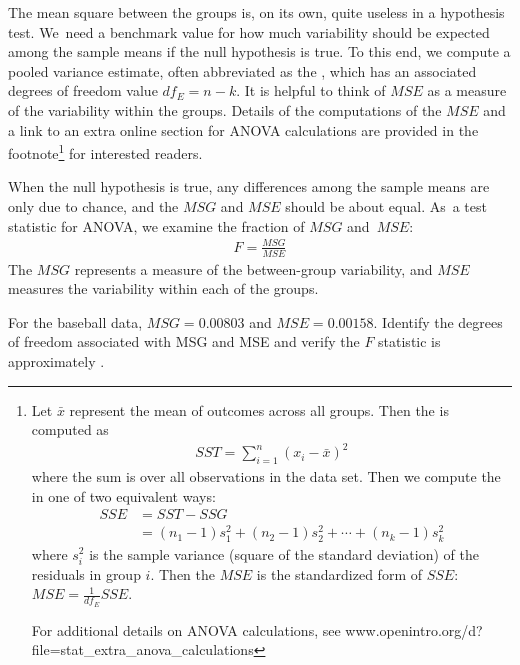 The mean square between the groups is, on its own, quite useless
in a hypothesis test.
We~need a benchmark value for how much variability should
be expected among the sample means if the null hypothesis is true.
To this end, we compute a pooled variance estimate,
often abbreviated as the ,
which has an associated degrees of freedom value $df_E = n - k$.
It is helpful to think of $MSE$ as a measure of the variability
within the groups.
Details of the computations of the $MSE$ and a link to an
extra online section for ANOVA calculations are provided
in the footnote\footnote{Let $\bar{x}$ represent the mean
  of outcomes across all groups.
  Then the  is computed as
  \begin{align*}
  SST = \sum_{i=1}^{n} \left(x_{i} - \bar{x}\right)^2
  \end{align*}
  where the sum is over all observations in the data set.
  Then we compute the 
  in one of two equivalent ways:
  \begin{align*}
  SSE &= SST - SSG \\
  	&= (n_1-1)s_1^2 + (n_2-1)s_2^2 + \cdots + (n_k-1)s_k^2
  \end{align*}
  where $s_i^2$ is the sample variance (square of the standard
  deviation) of the residuals in group $i$.
  Then the $MSE$ is the standardized form of $SSE$:
  $MSE = \frac{1}{df_{E}}SSE$.
  
  \noindent%
  For additional details on ANOVA calculations, see
      {www.openintro.org/d?file=stat\_extra\_anova\_calculations}}
for interested readers.

When the null hypothesis is true, any differences among the
sample means are only due to chance, and the $MSG$ and $MSE$
should be about equal.
As~a test statistic for ANOVA, we examine the fraction of $MSG$
and~$MSE$:
\begin{align*}
F = \frac{MSG}{MSE}
\end{align*}
The $MSG$ represents a measure of the between-group variability,
and $MSE$ measures the variability within each of the groups.

\begin{exercisewrap}
\begin{nexercise}
For the baseball data, $MSG = 0.00803$ and $MSE=0.00158$.
Identify the degrees of freedom associated with MSG and
MSE and verify the $F$ statistic is approximately
\mlbF{}.\footnotemark{}
\end{nexercise}
\end{exercisewrap}


